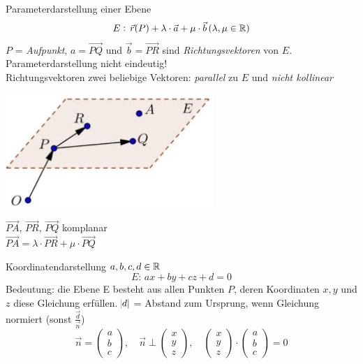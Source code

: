 \begin{minipage}{0.6\linewidth}
\begin{definition}{Parameterdarstellung} einer Ebene
    $$E:\,\vec{r}(P)+\lambda\cdot\vec{a}+\mu\cdot\vec{b}\, (\lambda,\mu\in\mathbb{R})$$
    $P$ = \textit{Aufpunkt}, $a=\overrightarrow{PQ}$ und 
    $\vec{b}=\overrightarrow{PR}$ sind \textit{Richtungsvektoren} von $E$.\\

    Parameterdarstellung nicht eindeutig!\\ Richtungsvektoren zwei beliebige
    Vektoren: \textit{parallel} zu $E$ und \textit{nicht kollinear}
\end{definition}
\end{minipage}
\begin{minipage}{0.4\linewidth}
    \begin{center}
    \includegraphics[width=0.8\linewidth]{ebene.png}
    \end{center}
    $\overrightarrow{PA}$, $\overrightarrow{PR}$, $\overrightarrow{PQ}$ komplanar\\

    $\overrightarrow{PA} = \lambda \cdot \overrightarrow{PR} + \mu \cdot \overrightarrow{PQ}$
\end{minipage}


\begin{definition}{Koordinatendarstellung} $a,b,c,d\in \mathbb{R}$
    $$E:\,ax+by+cz+d=0$$
    Bedeutung: die Ebene E besteht aus allen Punkten $P$, deren Koordinaten
    $x, y$ und $z$ diese Gleichung erfüllen.
    $\abs{d}$ = Abstand zum Ursprung, wenn Gleichung normiert
    (sonst $\frac{\vec{d}}{\vec{n}}$)
    {\small
    $$\vec{n} = \begin{pmatrix} a \\ b \\ c \end{pmatrix}, \quad
    \vec{n} \perp \begin{pmatrix} x \\ y \\ z \end{pmatrix}, \quad
    \begin{pmatrix} x \\ y \\ z \end{pmatrix} \cdot \begin{pmatrix} a \\ b \\ c \end{pmatrix} = 0$$
    }
\end{definition}

